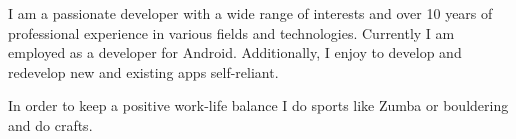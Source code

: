 

\begin{cvparagraph}

I am a passionate developer with a wide range of interests and over 10 years of professional experience in various fields and technologies. Currently I am employed as a developer for Android. Additionally, I enjoy to develop and redevelop new and existing apps self-reliant. 

In order to keep a positive work-life balance I do sports like Zumba or bouldering and do crafts.
\end{cvparagraph}
